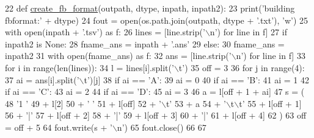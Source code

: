 \begin{DoxyCode}
22 \textcolor{keyword}{def }\hyperlink{namespaceparlai_1_1tasks_1_1wikiqa_1_1build_a554828702769592403db58c955d1dfe3}{create\_fb\_format}(outpath, dtype, inpath, inpath2):
23     print(\textcolor{stringliteral}{'building fbformat:'} + dtype)
24     fout = open(os.path.join(outpath, dtype + \textcolor{stringliteral}{'.txt'}), \textcolor{stringliteral}{'w'})
25     with open(inpath + \textcolor{stringliteral}{'.tsv'}) \textcolor{keyword}{as} f:
26         lines = [line.strip(\textcolor{stringliteral}{'\(\backslash\)n'}) \textcolor{keywordflow}{for} line \textcolor{keywordflow}{in} f]
27     \textcolor{keywordflow}{if} inpath2 \textcolor{keywordflow}{is} \textcolor{keywordtype}{None}:
28         fname\_ans = inpath + \textcolor{stringliteral}{'.ans'}
29     \textcolor{keywordflow}{else}:
30         fname\_ans = inpath2
31     with open(fname\_ans) \textcolor{keyword}{as} f:
32         ans = [line.strip(\textcolor{stringliteral}{'\(\backslash\)n'}) \textcolor{keywordflow}{for} line \textcolor{keywordflow}{in} f]
33     \textcolor{keywordflow}{for} i \textcolor{keywordflow}{in} range(len(lines)):
34         l = lines[i].split(\textcolor{stringliteral}{'\(\backslash\)t'})
35         off = 3
36         \textcolor{keywordflow}{for} j \textcolor{keywordflow}{in} range(4):
37             ai = ans[i].split(\textcolor{stringliteral}{'\(\backslash\)t'})[j]
38             \textcolor{keywordflow}{if} ai == \textcolor{stringliteral}{'A'}:
39                 ai = 0
40             \textcolor{keywordflow}{if} ai == \textcolor{stringliteral}{'B'}:
41                 ai = 1
42             \textcolor{keywordflow}{if} ai == \textcolor{stringliteral}{'C'}:
43                 ai = 2
44             \textcolor{keywordflow}{if} ai == \textcolor{stringliteral}{'D'}:
45                 ai = 3
46             a = l[off + 1 + ai]
47             s = (
48                 \textcolor{stringliteral}{'1 '}
49                 + l[2]
50                 + \textcolor{stringliteral}{' '}
51                 + l[off]
52                 + \textcolor{stringliteral}{'\(\backslash\)t'}
53                 + a
54                 + \textcolor{stringliteral}{'\(\backslash\)t\(\backslash\)t'}
55                 + l[off + 1]
56                 + \textcolor{stringliteral}{'|'}
57                 + l[off + 2]
58                 + \textcolor{stringliteral}{'|'}
59                 + l[off + 3]
60                 + \textcolor{stringliteral}{'|'}
61                 + l[off + 4]
62             )
63             off = off + 5
64             fout.write(s + \textcolor{stringliteral}{'\(\backslash\)n'})
65     fout.close()
66 
67 
\end{DoxyCode}


